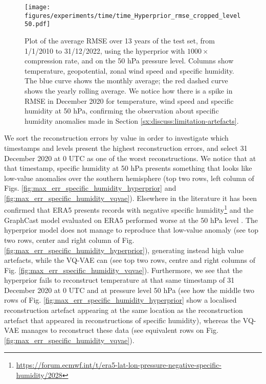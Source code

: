 \documentclass[11pt, a4paper, logo, copyright, numbering]{googledeepmind}
\begin{document}
\begin{figure}
    \centering
    \texttt{[image: figures/experiments/time/time\_Hyperprior\_rmse\_cropped\_level50.pdf]}
    \hfill
    \caption{Plot of the average RMSE over 13 years of the test set, from 1/1/2010 to 31/12/2022, using the hyperprior with $1000\times$ compression rate, and on the 50 hPa pressure level. Columns show temperature, geopotential, zonal wind speed and specific humidity. The blue curve shows the monthly average; the red dashed curve shows the yearly rolling average. We notice how there is a spike in RMSE in December 2020 for temperature, wind speed and specific humidity at 50 hPa, confirming the observation about specific humidity anomalies made in Section \ref{sx:discuss:limitation-artefacts}.}
    \label{fig:generalisation-time-50hPa}
\end{figure}


We sort the reconstruction errors by value in order to investigate which timestamps and levels present the highest reconstruction errors, and select 31 December 2020 at 0 UTC as one of the worst reconstructions. We notice that at that timestamp, specific humidity at 50 hPa presents something that looks like low-value anomalies over the southern hemisphere (top two rows, left column of Figs. \ref{fig:max_err_specific_humidity_hyperprior} and \ref{fig:max_err_specific_humidity_vqvae}). Elsewhere in the literature it has been confirmed that ERA5 presents records with negative specific humidity\footnote{\url{https://forum.ecmwf.int/t/era5-lat-lon-pressure-negative-specific-humidity/2028}} and the GraphCast model evaluated on ERA5 performed worse at the 50 hPa level \citep{lam2023graphcast}. The hyperprior model does not manage to reproduce that low-value anomaly (see top two rows, center and right column of Fig. \ref{fig:max_err_specific_humidity_hyperprior}), generating instead high value artefacts, while the VQ-VAE can (see top two rows, centre and right columns of Fig. \ref{fig:max_err_specific_humidity_vqvae}). Furthermore, we see that the hyperprior fails to reconstruct temperature at that same timestamp of 31 December 2020 at 0 UTC and at pressure level 50 hPa (see how the middle two rows of Fig. \ref{fig:max_err_specific_humidity_hyperprior} show a localised reconstruction artefact appearing at the same location as the reconstruction artefact that appeared in reconstructions of specific humidity), whereas the VQ-VAE manages to reconstruct these data (see equivalent rows on Fig. \ref{fig:max_err_specific_humidity_vqvae}). 
\end{document}
